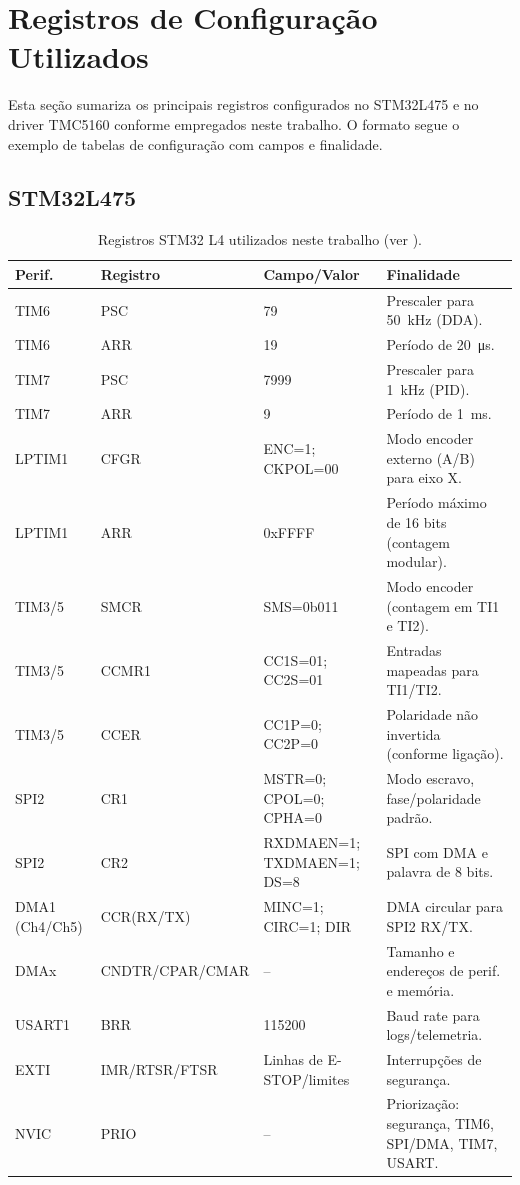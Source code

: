 \FloatBarrier
\section{Registros de Configura\c{c}\~ao Utilizados}

Esta se\c{c}\~ao sumariza os principais registros configurados no STM32L475 e
no driver TMC5160 conforme empregados neste trabalho. O formato segue o
exemplo de tabelas de configura\c{c}\~ao com campos e finalidade.

\subsection{STM32L475}

\begin{table}[htbp]
  \centering
  \caption{Registros STM32 L4 utilizados neste trabalho (ver \cite{st_an4013,stm32l4_rm}).}
  \label{tab:regs-stm32}
  \setlength{\tabcolsep}{4pt}\footnotesize
  \begin{tabularx}{\textwidth}{lllX}
    \toprule
    Perif. & Registro & Campo/Valor & Finalidade \\
    \midrule
    TIM6 & PSC & 79 & Prescaler para \SI{50}{kHz} (DDA). \\
    TIM6 & ARR & 19 & Per\'iodo de \SI{20}{\micro s}. \\
    TIM7 & PSC & 7999 & Prescaler para \SI{1}{kHz} (PID). \\
    TIM7 & ARR & 9 & Per\'iodo de \SI{1}{ms}. \\
    LPTIM1 & CFGR & ENC=1; CKPOL=00 & Modo encoder externo (A/B) para eixo X. \\
    LPTIM1 & ARR & 0xFFFF & Per\'iodo m\'aximo de 16 bits (contagem modular). \\
    TIM3/5 & SMCR & SMS=0b011 & Modo encoder (contagem em TI1 e TI2). \\
    TIM3/5 & CCMR1 & CC1S=01; CC2S=01 & Entradas mapeadas para TI1/TI2. \\
    TIM3/5 & CCER & CC1P=0; CC2P=0 & Polaridade n\~ao invertida (conforme liga\c{c}\~ao). \\
    SPI2 & CR1 & MSTR=0; CPOL=0; CPHA=0 & Modo escravo, fase/polaridade padr\~ao. \\
    SPI2 & CR2 & RXDMAEN=1; TXDMAEN=1; DS=8 & SPI com DMA e palavra de 8 bits. \\
    DMA1 (Ch4/Ch5) & CCR(RX/TX) & MINC=1; CIRC=1; DIR & DMA circular para SPI2 RX/TX. \\
    DMAx & CNDTR/CPAR/CMAR & -- & Tamanho e endere\c{c}os de perif. e mem\'oria. \\
    USART1 & BRR & 115200 & Baud rate para logs/telemetria. \\
    EXTI & IMR/RTSR/FTSR & Linhas de E-STOP/limites & Interrup\c{c}\~oes de seguran\c{c}a. \\
    NVIC & PRIO & -- & Prioriza\c{c}\~ao: seguran\c{c}a, TIM6, SPI/DMA, TIM7, USART. \\
    \bottomrule
  \end{tabularx}
\end{table}


